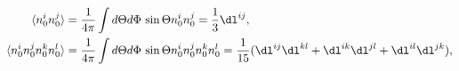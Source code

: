 \begin{equation*}
\begin{split}
  \langle n_0^in_0^j\rangle&
  =\frac1{4\pi}\int d\Theta d\Phi\,\sin\Theta n_0^in_0^j=\frac13\dl^{ij},
\\
  \langle n_0^in_0^jn_0^kn_0^l\rangle&
  =\frac1{4\pi}\int d\Theta d\Phi\,\sin\Theta n_0^in_0^jn_0^kn_0^l
  =\frac1{15}(\dl^{ij}\dl^{kl}+\dl^{ik}\dl^{jl}+\dl^{il}\dl^{jk}),
\end{split}
\end{equation*}

